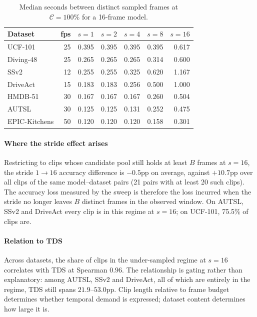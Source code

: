 \documentclass[a4paper, 10pt, conference, onecolumn]{ieeeconf}
\newcommand{\tabtight}{\setlength{\tabcolsep}{3.5pt}\renewcommand{\arraystretch}{1.12}}
\newcommand{\TDS}{\textsc{TDS}}
\begin{document}
\begin{table}[!htbp]
\centering
\caption{Median seconds between distinct sampled frames at
$\mathcal{C}{=}100\%$ for a 16-frame model.}
\label{tab:sup_seconds}
\scriptsize\tabtight
\begin{tabular}{l r rrrrr}
\toprule
Dataset & fps & $s{=}1$ & $s{=}2$ & $s{=}4$ & $s{=}8$ & $s{=}16$ \\
\midrule
UCF-101       & 25 & 0.395 & 0.395 & 0.395 & 0.395 & 0.617 \\
Diving-48     & 25 & 0.265 & 0.265 & 0.265 & 0.314 & 0.600 \\
SSv2          & 12 & 0.255 & 0.255 & 0.325 & 0.620 & 1.167 \\
DriveAct      & 15 & 0.183 & 0.183 & 0.256 & 0.500 & 1.000 \\
HMDB-51       & 30 & 0.167 & 0.167 & 0.167 & 0.260 & 0.504 \\
AUTSL         & 30 & 0.125 & 0.125 & 0.131 & 0.252 & 0.475 \\
EPIC-Kitchens & 50 & 0.120 & 0.120 & 0.120 & 0.158 & 0.301 \\
\bottomrule
\end{tabular}
\end{table}

\paragraph{Where the stride effect arises} Restricting to clips whose candidate
pool still holds at least $B$ frames at $s{=}16$, the stride $1\to16$ accuracy
difference is $-0.5$pp on average, against $+10.7$pp over all clips of the same
model--dataset pairs (21 pairs with at least 20 such clips). The accuracy loss
measured by the sweep is therefore the loss incurred when the stride no longer
leaves $B$ distinct frames in the observed window. On AUTSL, SSv2 and DriveAct
every clip is in this regime at $s{=}16$; on UCF-101, 75.5\% of clips are.

\paragraph{Relation to \TDS{}} Across datasets, the share of clips in the
under-sampled regime at $s{=}16$ correlates with \TDS{} at Spearman $0.96$. The
relationship is gating rather than explanatory: among AUTSL, SSv2 and DriveAct,
all of which are entirely in the regime, \TDS{} still spans $21.9$--$53.0$pp.
Clip length relative to frame budget determines whether temporal demand is
expressed; dataset content determines how large it is.
\end{document}
